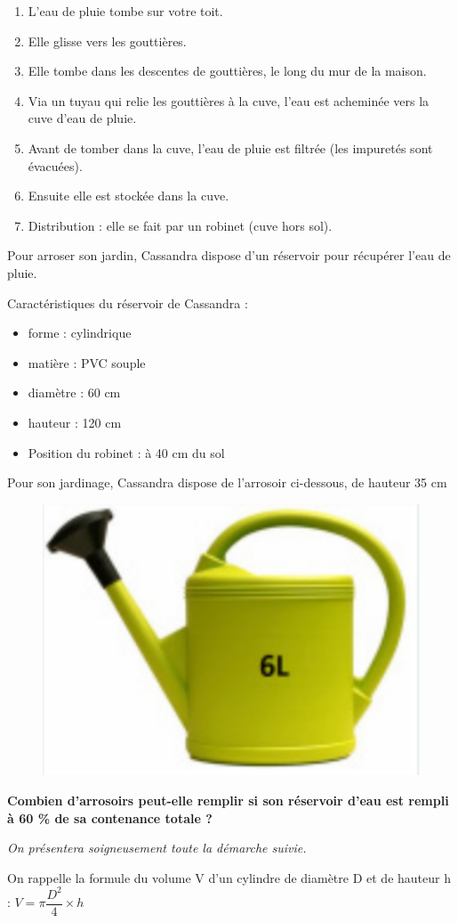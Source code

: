 \documentclass[12pt]{article}
\begin{document}
\begin{multicols}{2}
\begin{enumerate}
\item[1.] L’eau de pluie tombe sur votre toit.
\item[2.] Elle glisse vers les gouttières.
\item[3.] Elle tombe dans les descentes de gouttières, le long du mur de la maison.
\item[4.] Via un tuyau qui relie les gouttières à la cuve, l’eau est acheminée vers la cuve d’eau de pluie.
\item[5.] Avant de tomber dans la cuve, l’eau de pluie est filtrée (les impuretés sont évacuées).
\item[6.] Ensuite elle est stockée dans la cuve.
\item[7.] Distribution : elle se fait par un robinet (cuve hors sol).
\end{enumerate}

Pour arroser son jardin, Cassandra dispose d’un réservoir pour récupérer l’eau de pluie.

Caractéristiques du réservoir de Cassandra :
\begin{itemize}
\item forme : cylindrique
\item matière : PVC souple
\item diamètre : 60 cm
\item hauteur : 120 cm
\item Position du robinet : à 40 cm du sol
\end{itemize}
\end{multicols}


Pour son jardinage, Cassandra dispose de l’arrosoir ci-dessous, de hauteur 35 cm

\begin{multicols}{2}

  \begin{figure}[H]
    \centering
    \includegraphics[width=0.8\linewidth]{sources/arrosoir.pdf}
  \end{figure}

\textbf{Combien d’arrosoirs peut-elle remplir si son réservoir d’eau est rempli à 60 \% de sa contenance totale ?}

\textit{On présentera soigneusement toute la démarche suivie.}

On rappelle la formule du volume V d’un cylindre de diamètre D et de hauteur h : $V = \pi \dfrac{D^2}{4}\times h$

\end{multicols}
\end{document}
